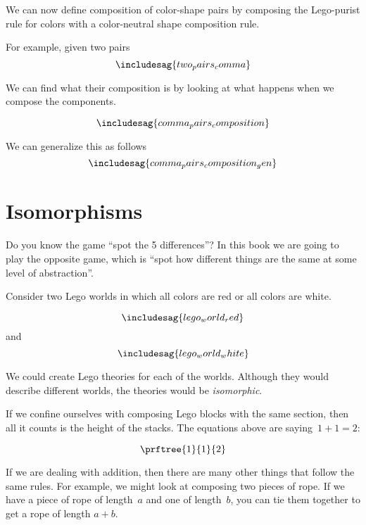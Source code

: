 We can now define composition of color-shape pairs by composing the Lego-purist rule for colors with a color-neutral shape composition rule.

For example, given two pairs
%
\begin{equation*}
\includesag{two_pairs_comma}
\end{equation*}

%
We can find what their composition is by looking at what happens when we compose the components.

\begin{equation*}
\includesag{comma_pairs_composition}
\end{equation*}

We can generalize this as follows
\begin{equation*}
\includesag{comma_pairs_composition_gen}
\end{equation*}

\section{Isomorphisms}


Do you know the game ``spot the 5 differences''? In this book we are going to play the opposite game, which is ``spot how different things are the same at some level of abstraction''.

Consider two Lego worlds in which all colors are red or all colors are white.

\begin{equation}
\includesag{lego_world_red}
\end{equation}
and
\begin{equation}
\includesag{lego_world_white}
\end{equation}

We could create Lego theories for each of the worlds. Although they would describe different worlds, the theories would be \emph{isomorphic}.

If we confine ourselves with composing Lego blocks with the same section, then all it counts is the height of the stacks.
The equations above are saying~$1+1=2$:

\begin{equation}
  \prftree{1}{1}{2}
\end{equation}

If we are dealing with addition, then there are many other things that follow the same rules.
For example, we might look at composing two pieces of rope. If we have a piece of rope of length~$a$ and one of length~$b$, you can tie them together to get a rope of length $a+b$.


